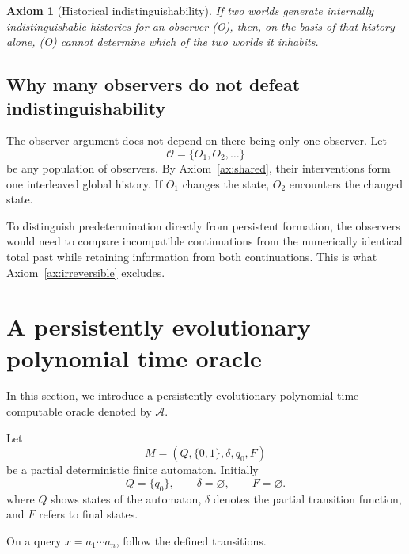 \documentclass[11pt]{article}
\newtheorem{axiom}[definition]{Axiom}
\newcommand{\bits}{\{0,1\}}
\newcommand{\Aev}{\mathcal A}
\newcommand{\Obs}{\mathcal O}
\begin{document}
\begin{axiom}[Historical indistinguishability]\label{ax:ind}
If two worlds generate internally indistinguishable histories for an observer (O), then, on the basis of that history alone, (O) cannot determine which of the two worlds it inhabits.
\end{axiom}


\subsection{Why many observers do not defeat indistinguishability}

The observer argument does not depend on there being only one observer.  Let
\[
  \Obs=\{O_1,O_2,\ldots\}
\]
be any population of observers.  By Axiom~\ref{ax:shared}, their interventions form one
interleaved global history.  If \(O_1\) changes the state, \(O_2\) encounters the changed
state.

To distinguish predetermination directly from persistent formation, the observers would need
to compare incompatible continuations from the numerically identical total past while
retaining information from both continuations.  This is what Axiom~\ref{ax:irreversible}
excludes.




\section{A persistently evolutionary polynomial time  oracle}\label{sec:oracleA}
In this section, we introduce a  persistently evolutionary polynomial time computable oracle denoted by \(\Aev\).

Let
\[
M=(Q,\bits,\delta,q_0,F)
\]
be a partial deterministic finite automaton.  Initially
\[
Q=\{q_0\},\qquad \delta=\varnothing,\qquad F=\varnothing.
\]
where \(Q\) shows states of the automaton, \( \delta\)  denotes the partial transition function, and  \(F\) refers to final states.



On a query \(x=a_1\cdots a_n\), follow the defined transitions.
\end{document}
